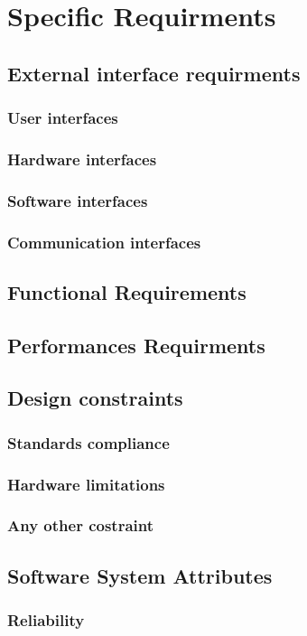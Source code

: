 \documentclass[12pt,a4paper]{report}
\begin{document}
\chapter{Specific Requirments}
	\section{External interface requirments}
		\subsection{User interfaces}
		\subsection{Hardware interfaces}
		\subsection{Software interfaces}
		\subsection{Communication interfaces}
	\section{Functional Requirements}
	\section{Performances Requirments}
	\section{Design constraints}
		\subsection{Standards compliance}
		\subsection{Hardware limitations}
		\subsection{Any other costraint}
	\section{Software System Attributes}
		\subsection{Reliability}
\end{document}
